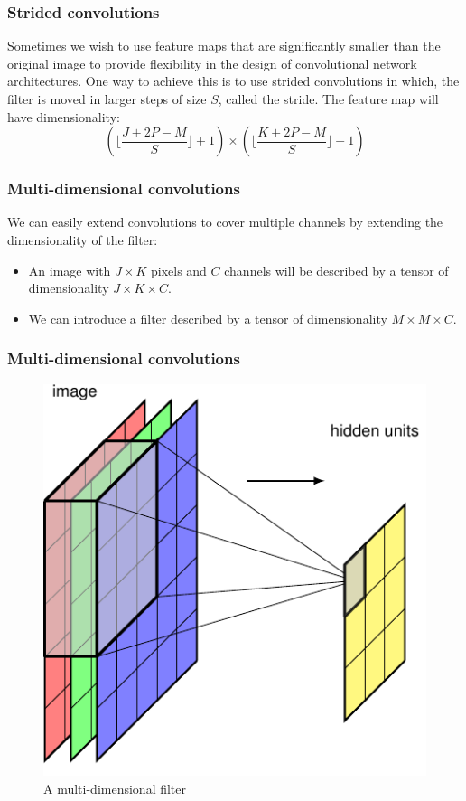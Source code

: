 \documentclass{beamer}
\begin{document}
\begin{frame}
    \frametitle{Strided convolutions}
    Sometimes we wish to use feature maps that are significantly smaller than the original image to provide flexibility in the design of convolutional network architectures. One way to achieve this is to use strided convolutions in which, the filter is moved in larger steps of size $S$, called the stride. The feature map will have dimensionality:
    \begin{equation*}
        (\lfloor\frac{J+2P-M}{S}\rfloor+1)\times(\lfloor\frac{K+2P-M}{S}\rfloor+1)
    \end{equation*}
\end{frame}

\begin{frame}
    \frametitle{Multi-dimensional convolutions}
    We can easily extend convolutions to cover multiple channels by extending the dimensionality of the filter:
    \begin{itemize}
        \item An image with $J\times{}K$ pixels and $C$ channels will be described by a tensor of dimensionality $J\times{}K\times{}C$.
        \item We can introduce a filter described by a tensor of dimensionality $M\times{}M\times{}C$.
    \end{itemize}
\end{frame}

\begin{frame}
    \frametitle{Multi-dimensional convolutions}
    \begin{figure}
        \caption{A multi-dimensional filter}
        \includegraphics[height=0.7\textheight]{Figure_6_a.pdf}
    \end{figure}
\end{frame}
\end{document}
